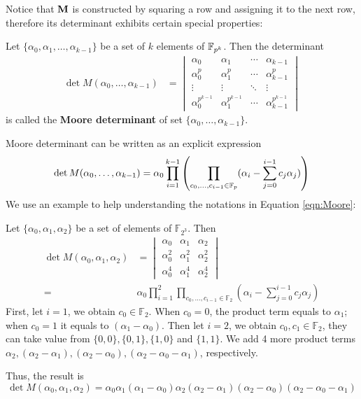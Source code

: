 Notice that ${\bf M}$ is constructed by squaring a row and assigning it to the next row,
therefore its determinant exhibits certain special properties:
\begin{Definition}
Let $\{\alpha_0,\alpha_1,\dots,\alpha_{k-1}\}$ be a set of $k$ elements of ${\mathbb{F}}_{p^k}$. Then the determinant
\begin{align}
\det{M(\alpha_0,\dots,\alpha_{k-1})} &= 
\begin{vmatrix}
\alpha_0 & \alpha_1 & \cdots & \alpha_{k-1} \\
\alpha_0^p & \alpha_1^p & \cdots & \alpha_{k-1}^p \\
\vdots & \vdots & \ddots & \vdots \\
\alpha_0^{p^{k-1}} & \alpha_1^{p^{k-1}} & \cdots & \alpha_{k-1}^{p^{k-1}}
\end{vmatrix}
\end{align}
is called the {\bf Moore determinant} of set $\{\alpha_0,\dots,\alpha_{k-1}\}$.
\end{Definition}
Moore determinant can be written as an explicit expression
\begin{equation}
\label{eqn:Moore}
\det{M(\alpha_0,\dots,\alpha_{k-1})} = \alpha_0 \prod_{i=1}^{k-1}\left( \prod_{c_0,\dots,c_{i-1}\in {\mathbb{F}}_{p}} (\alpha_{i} - \sum_{j=0}^{i-1}c_j\alpha_j)\right)
\end{equation}
We use an example to help understanding the notations in Equation \ref{eqn:Moore}:
\begin{Example}
Let $\{\alpha_0,\alpha_1,\alpha_2\}$ be a set of elements of $\mathbb F_{2^3}$. Then
\begin{align}
\det{M(\alpha_0,\alpha_1,\alpha_2)} &= 
\begin{vmatrix}
\alpha_0 & \alpha_1 & \alpha_2 \\
\alpha_0^2 & \alpha_1^2 & \alpha_2^2 \\
\alpha_0^4 & \alpha_1^4 & \alpha_2^4
\end{vmatrix} \\ \nonumber
=& \alpha_0 \prod_{i=1}^{2} \prod_{c_0,\dots,c_{i-1}\in \mathbb F_2} (\alpha_{i} - \displaystyle\sum_{j=0}^{i-1}c_j\alpha_j)
\end{align}
First, let $i=1$,  we obtain $c_0\in \mathbb F_2$. When $c_0=0$, the product term equals to $\alpha_1$; when $c_0=1$ it equals to $(\alpha_1-\alpha_0)$.
Then let $i=2$, we obtain ${c_0,c_1}\in \mathbb F_2$, they can take value from $\{0,0\},\{0,1\},\{1,0\}$ and $\{1,1\}$.
We add 4 more product terms $\alpha_2,(\alpha_2-\alpha_1),(\alpha_2-\alpha_0),(\alpha_2-\alpha_0-\alpha_1)$, respectively.

Thus, the result is
\begin{equation}
\det{M(\alpha_0,\alpha_1,\alpha_2)} = \alpha_0\alpha_1(\alpha_1-\alpha_0)\alpha_2(\alpha_2-\alpha_1)(\alpha_2-\alpha_0)(\alpha_2-\alpha_0-\alpha_1)
\end{equation}
\end{Example}
